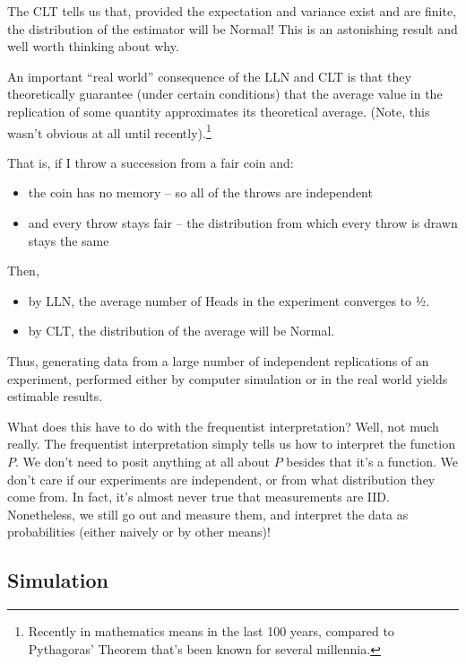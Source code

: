 The CLT tells us that, 
provided the expectation and variance exist and are finite, 
the distribution of the estimator will be Normal! 
This is an astonishing result and well worth thinking about why.

%

An important ``real world'' consequence of the LLN and CLT is that they 
theoretically guarantee (under certain conditions) that the average value in the replication 
of some quantity approximates its theoretical average. 
(Note, this wasn't obvious at all until recently).\footnote{Recently in mathematics means in the last 100 years, 
compared to Pythagoras' Theorem that's been known for several millennia.}

That is, if I throw a succession from a fair coin and:
\begin{itemize}
\item the coin has no memory -- so all of the throws are independent
\item and every throw stays fair -- the distribution from which every throw is 
drawn stays the same
\end{itemize}

Then,
\begin{itemize}
\item by LLN, the average number of Heads in the experiment converges to ½. 
\item by CLT, the distribution of the average will be Normal.
\end{itemize}

Thus, generating data from a large number of independent replications of an experiment, 
performed either by computer simulation or in the real world yields estimable results.

What does this have to do with the frequentist interpretation? 
Well, not much really. 
The frequentist interpretation simply tells us how to interpret the function \(P\). 
We don't need to posit anything at all about \(P\) besides that it's a function. 
We don't care if our experiments are independent, 
or from what distribution they come from.
In fact, 
it's almost never true that measurements are IID. 
Nonetheless, we still go out and measure them, and interpret the data as probabilities (either naively or by other means)!

\subsection{Simulation}

